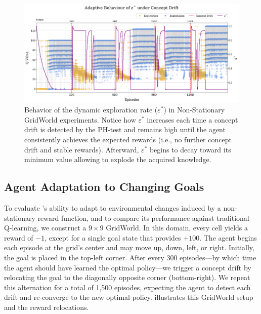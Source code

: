 \begin{figure}
    \centering
    \includegraphics[width=\textwidth]{figures/eps}
    \caption{Behavior of the dynamic exploration rate ($\varepsilon^*$) in Non-Stationary GridWorld experiments. Notice how $\varepsilon^*$ increases each time a concept drift is detected by the PH-test and remains high until the agent consistently achieves the expected rewards (i.e., no further concept drift and stable rewards). Afterward, $\varepsilon^*$ begins to decay toward its minimum value allowing to explode the acquired knowledge.}
    \label{fig:dynamic-eps}
\end{figure}

\subsection{Agent Adaptation to Changing Goals}
\label{sec:experiments}

To evaluate \adaptiverl’s ability to adapt to environmental changes induced by a non-stationary reward function, and to compare its performance against traditional Q-learning, we construct a $9\times 9$ GridWorld. In this domain, every cell yields a reward of $-1$, except for a single goal state that provides $+100$. The agent begins each episode at the grid’s center and may move up, down, left, or right. Initially, the goal is placed in the top-left corner. After every 300 episodes—by which time the agent should have learned the optimal policy—we trigger a concept drift by relocating the goal to the diagonally opposite corner (bottom-right). We repeat this alternation for a total of 1,500 episodes, expecting the agent to detect each drift and re-converge to the new optimal policy.  illustrates this GridWorld setup and the reward relocations.

